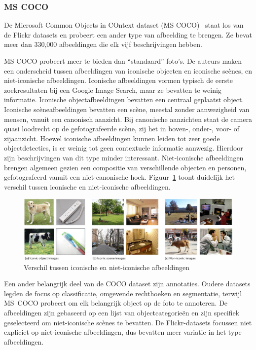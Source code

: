 \subsubsection{MS COCO}
\label{par:MS COCO}
De Microsoft Common Objects in COntext dataset (MS COCO)~\cite{Lin2014} staat los van de Flickr datasets en probeert een ander type van afbeelding te brengen. Ze bevat meer dan 330,000 afbeeldingen die elk vijf beschrijvingen hebben. 

MS COCO probeert meer te bieden dan ``standaard'' foto's. De auteurs maken een onderscheid tussen afbeeldingen van iconische objecten en iconische sc\`enes, en niet-iconische afbeeldingen. Iconische afbeeldingen vormen typisch de eerste zoekresultaten bij een Google Image Search, maar ze bevatten te weinig informatie. Iconische objectafbeeldingen bevatten een centraal geplaatst object. Iconische sc\`eneafbeeldingen bevatten een sc\`ene, meestal zonder aanwezigheid van mensen, vanuit een canonisch aanzicht. Bij canonische aanzichten staat de camera quasi loodrecht op de gefotografeerde sc\`ene, zij het in boven-, onder-, voor- of zijaanzicht. Hoewel iconische afbeeldingen kunnen leiden tot zeer goede objectdetecties, is er weinig tot geen contextuele informatie aanwezig. Hierdoor zijn beschrijvingen van dit type minder interessant.  Niet-iconische afbeeldingen brengen algemeen gezien een compositie van verschillende objecten en personen, gefotografeerd vanuit een niet-canonische hoek. Figuur~\ref{fig:cocotypes} toont duidelijk het verschil tussen iconische en niet-iconische afbeeldingen.

\begin{figure}[tb]
    \centering
    \includegraphics[width=\linewidth]{Images/iconic.jpg}
    \caption{Verschil tussen iconische en niet-iconische afbeeldingen~\cite{Lin2014}}
    \label{fig:cocotypes}
\end{figure}

Een ander belangrijk deel van de COCO dataset zijn annotaties. Oudere datasets legden de focus op classificatie, omgevende rechthoeken en segmentatie, terwijl \mbox{MS COCO} probeert om elk belangrijk object op de foto te annoteren. De afbeeldingen zijn gebaseerd op een lijst van objectcategorie\"en en zijn specifiek geselecteerd om niet-iconische sc\`enes te bevatten. De Flickr-datasets focussen niet expliciet op niet-iconische afbeeldingen, dus bevatten meer variatie in het type afbeeldingen.


